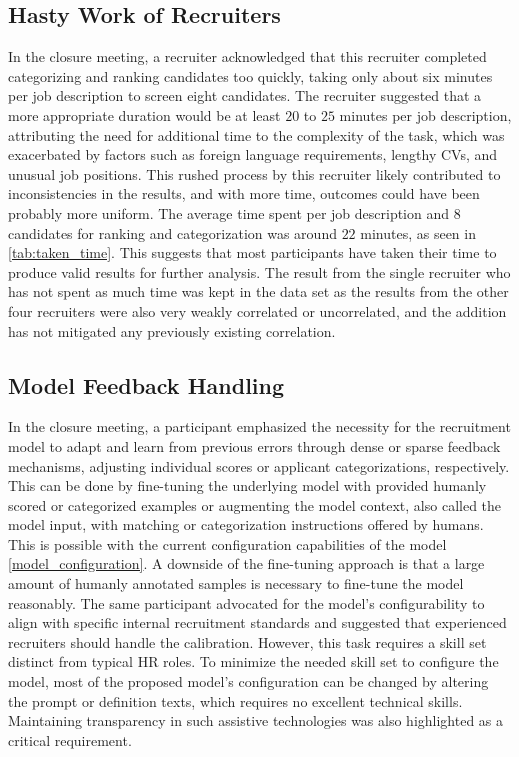 \documentclass[draft,final]{thesisclass} %
\begin{document}
\subsection{Hasty Work of Recruiters}
In the closure meeting, a recruiter acknowledged that this recruiter completed categorizing and ranking candidates too quickly, taking only about six minutes per job description to screen eight candidates. The recruiter suggested that a more appropriate duration would be at least $20$ to $25$ minutes per job description, attributing the need for additional time to the complexity of the task, which was exacerbated by factors such as foreign language requirements, lengthy \acs{CV}s, and unusual job positions. This rushed process by this recruiter likely contributed to inconsistencies in the results, and with more time, outcomes could have been probably more uniform. The average time spent per job description and $8$ candidates for ranking and categorization was around $22$ minutes, as seen in \ref{tab:taken_time}. This suggests that most participants have taken their time to produce valid results for further analysis. The result from the single recruiter who has not spent as much time was kept in the data set as the results from the other four recruiters were also very weakly correlated or uncorrelated, and the addition has not mitigated any previously existing correlation.

\subsection{Model Feedback Handling}
In the closure meeting, a participant emphasized the necessity for the recruitment model to adapt and learn from previous errors through dense or sparse feedback mechanisms, adjusting individual scores or applicant categorizations, respectively. This can be done by fine-tuning the underlying model with provided humanly scored or categorized examples or augmenting the model context, also called the model input, with matching or categorization instructions offered by humans. This is possible with the current configuration capabilities of the model \ref{model_configuration}. A downside of the fine-tuning approach is that a large amount of humanly annotated samples is necessary to fine-tune the model reasonably. The same participant advocated for the model's configurability to align with specific internal recruitment standards and suggested that experienced recruiters should handle the calibration. However, this task requires a skill set distinct from typical \acs{HR} roles. To minimize the needed skill set to configure the model, most of the proposed model's configuration can be changed by altering the prompt or definition texts, which requires no excellent technical skills. Maintaining transparency in such assistive technologies was also highlighted as a critical requirement.
\end{document}
